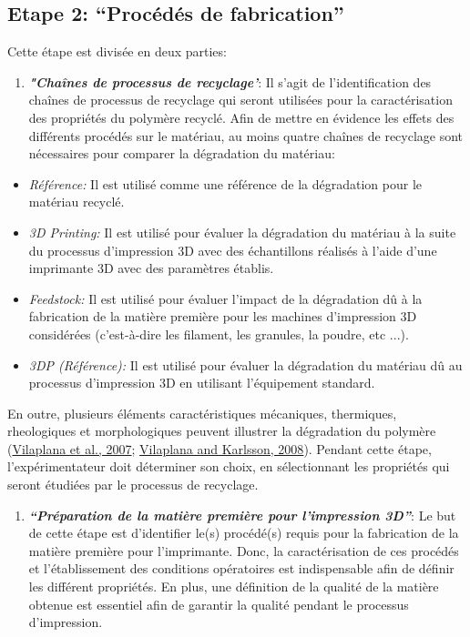 \documentclass[
]{article}
\providecommand{\tightlist}{%
  \setlength{\itemsep}{0pt}\setlength{\parskip}{0pt}}
\begin{document}
\hypertarget{Step2}{%
\subsection{Etape 2: ``Procédés de fabrication''}\label{Step2}}

Cette étape est divisée en deux parties:

\begin{enumerate}
\def\labelenumi{\arabic{enumi}.}
\tightlist
\item
  \textbf{\emph{"Chaînes de processus de recyclage'}}: Il s'agit de
  l'identification des chaînes de processus de recyclage qui seront
  utilisées pour la caractérisation des propriétés du polymère recyclé.
  Afin de mettre en évidence les effets des différents procédés sur le
  matériau, au moins quatre chaînes de recyclage sont nécessaires pour
  comparer la dégradation du matériau:
\end{enumerate}

\begin{itemize}
\item
  \emph{Référence:} Il est utilisé comme une référence de la dégradation
  pour le matériau recyclé.
\item
  \emph{3D Printing:} Il est utilisé pour évaluer la dégradation du
  matériau à la suite du processus d'impression 3D avec des échantillons
  réalisés à l'aide d'une imprimante 3D avec des paramètres établis.
\item
  \emph{Feedstock:} Il est utilisé pour évaluer l'impact de la
  dégradation dû à la fabrication de la matière première pour les
  machines d'impression 3D considérées (c'est-à-dire les filament, les
  granules, la poudre, etc ...).
\item
  \emph{3DP (Référence):} Il est utilisé pour évaluer la dégradation du
  matériau dû au processus d'impression 3D en utilisant l'équipement
  standard.
\end{itemize}

En outre, plusieurs éléments caractéristiques mécaniques, thermiques,
rheologiques et morphologiques peuvent illustrer la dégradation du
polymère (\protect\hyperlink{ref-Vilaplana2007}{Vilaplana et al., 2007};
\protect\hyperlink{ref-Vilaplana2008}{Vilaplana and Karlsson, 2008}).
Pendant cette étape, l'expérimentateur doit déterminer son choix, en
sélectionnant les propriétés qui seront étudiées par le processus de
recyclage.

\begin{enumerate}
\def\labelenumi{\arabic{enumi}.}
\setcounter{enumi}{1}
\tightlist
\item
  \textbf{\emph{``Préparation de la matière première pour l'impression
  3D''}}: Le but de cette étape est d'identifier le(s) procédé(s) requis
  pour la fabrication de la matière première pour l'imprimante. Donc, la
  caractérisation de ces procédés et l'établissement des conditions
  opératoires est indispensable afin de définir les différent
  propriétés. En plus, une définition de la qualité de la matière
  obtenue est essentiel afin de garantir la qualité pendant le processus
  d'impression.
\end{enumerate}
\end{document}
